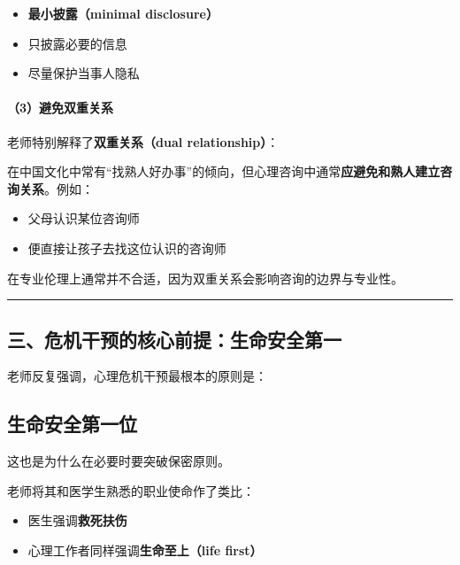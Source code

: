 \documentclass[
  chinese,
  9pt,
  a4paper,
]{ctexart}
\providecommand{\tightlist}{%
  \setlength{\itemsep}{0pt}\setlength{\parskip}{0pt}}
\begin{document}
\begin{itemize}
\tightlist
\item
  \textbf{最小披露（minimal disclosure）}
\item
  只披露必要的信息
\item
  尽量保护当事人隐私
\end{itemize}

\paragraph{（3）避免双重关系}\label{ux907fux514dux53ccux91cdux5173ux7cfb}

老师特别解释了\textbf{双重关系（dual relationship）}：

在中国文化中常有``找熟人好办事''的倾向，但心理咨询中通常\textbf{应避免和熟人建立咨询关系}。例如：

\begin{itemize}
\tightlist
\item
  父母认识某位咨询师
\item
  便直接让孩子去找这位认识的咨询师
\end{itemize}

在专业伦理上通常并不合适，因为双重关系会影响咨询的边界与专业性。

\begin{center}\rule{0.5\linewidth}{0.5pt}\end{center}

\subsection{三、危机干预的核心前提：生命安全第一}\label{ux4e09ux5371ux673aux5e72ux9884ux7684ux6838ux5fc3ux524dux63d0ux751fux547dux5b89ux5168ux7b2cux4e00}

老师反复强调，心理危机干预最根本的原则是：

\subsection{\texorpdfstring{\textbf{生命安全第一位}}{生命安全第一位}}\label{ux751fux547dux5b89ux5168ux7b2cux4e00ux4f4d}

这也是为什么在必要时要突破保密原则。

老师将其和医学生熟悉的职业使命作了类比：

\begin{itemize}
\tightlist
\item
  医生强调\textbf{救死扶伤}
\item
  心理工作者同样强调\textbf{生命至上（life first）}
\end{itemize}
\end{document}
